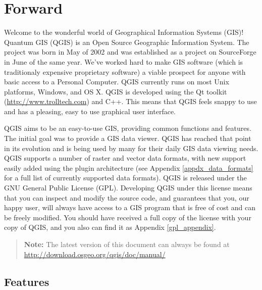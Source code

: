 
\section{Forward}\label{label_forward}
\setcounter{page}{1}

\updatedisclaimer

Welcome to the wonderful world of Geographical Information Systems (GIS)!
Quantum GIS (QGIS) is an Open Source Geographic Information System. The project
was born in May of 2002 and was established as a project on SourceForge in June
of the same year. We've worked hard to make GIS software (which is traditionaly
expensive proprietary software) a viable prospect for anyone with basic access
to a Personal Computer. QGIS currently runs on most Unix platforms, Windows, and
OS X. QGIS is developed using the Qt toolkit (\url{http://www.trolltech.com})
and C++. This means that QGIS feels snappy to use and has a pleasing, easy to
use graphical user interface. 

QGIS aims to be an easy-to-use GIS, providing common functions and features.
The initial goal was to provide a GIS data viewer. QGIS has reached that point
in its evolution and is being used by many for their daily GIS data viewing
needs. QGIS supports a number of raster and vector data formats, with new
support easily added using the plugin architecture (see Appendix
\ref{appdx_data_formats} for a full list of currently supported data formats).
QGIS is released under the GNU General Public License (GPL). Developing QGIS 
under this license means that you can inspect and modify the source code,
and guarantees that you, our happy user, will always have access to a GIS
program that is free of cost and can be freely modified. You should have
received a full copy of the license with your copy of QGIS, and you also can
find it as Appendix \ref{gpl_appendix}.  

\begin{quote}
\begin{center}
\textbf{Note:} The latest version of this document can always be found at \newline
\url{http://download.osgeo.org/qgis/doc/manual/}
\end{center}
\end{quote}

\subsection{Features}\label{label_majfeat}

